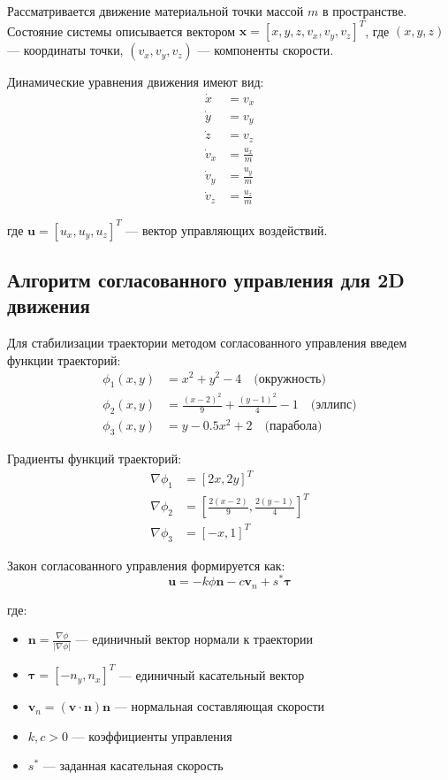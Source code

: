 Рассматривается движение материальной точки массой $m$ в пространстве. Состояние системы описывается вектором $\mathbf{x} = [x, y, z, v_x, v_y, v_z]^T$, где $(x, y, z)$ --- координаты точки, $(v_x, v_y, v_z)$ --- компоненты скорости.

Динамические уравнения движения имеют вид:
\begin{align}
\dot{x} &= v_x \\
\dot{y} &= v_y \\
\dot{z} &= v_z \\
\dot{v}_x &= \frac{u_x}{m} \\
\dot{v}_y &= \frac{u_y}{m} \\
\dot{v}_z &= \frac{u_z}{m}
\end{align}

где $\mathbf{u} = [u_x, u_y, u_z]^T$ --- вектор управляющих воздействий.

\subsection{Алгоритм согласованного управления для 2D движения}

Для стабилизации траектории методом согласованного управления введем функции траекторий:
\begin{align}
\phi_1(x, y) &= x^2 + y^2 - 4 \quad \text{(окружность)} \\
\phi_2(x, y) &= \frac{(x-2)^2}{9} + \frac{(y-1)^2}{4} - 1 \quad \text{(эллипс)} \\
\phi_3(x, y) &= y - 0.5x^2 + 2 \quad \text{(парабола)}
\end{align}

Градиенты функций траекторий:
\begin{align}
\nabla\phi_1 &= [2x, 2y]^T \\
\nabla\phi_2 &= \left[\frac{2(x-2)}{9}, \frac{2(y-1)}{4}\right]^T \\
\nabla\phi_3 &= [-x, 1]^T
\end{align}

Закон согласованного управления формируется как:
$$\mathbf{u} = -k\phi\mathbf{n} - c\mathbf{v}_n + s^*\boldsymbol{\tau}$$

где:
\begin{itemize}
\item $\mathbf{n} = \frac{\nabla\phi}{|\nabla\phi|}$ --- единичный вектор нормали к траектории
\item $\boldsymbol{\tau} = [-n_y, n_x]^T$ --- единичный касательный вектор
\item $\mathbf{v}_n = (\mathbf{v} \cdot \mathbf{n})\mathbf{n}$ --- нормальная составляющая скорости
\item $k, c > 0$ --- коэффициенты управления
\item $s^*$ --- заданная касательная скорость
\end{itemize}

